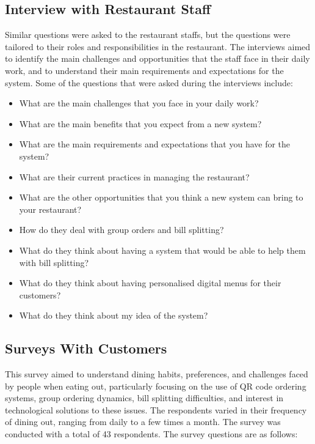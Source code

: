 \subsection*{Interview with Restaurant Staff}
Similar questions were asked to the restaurant staffs, but the questions were tailored to their roles and responsibilities in the restaurant. The interviews aimed to identify the main challenges and opportunities that the staff face in their daily work, and to understand their main requirements and expectations for the system. Some of the questions that were asked during the interviews include:
\begin{itemize}
    \item What are the main challenges that you face in your daily work?
    \item What are the main benefits that you expect from a new system?
    \item What are the main requirements and expectations that you have for the system?
    \item What are their current practices in managing the restaurant?
    \item What are the other opportunities that you think a new system can bring to your restaurant?
    \item How do they deal with group orders and bill splitting?
    \item What do they think about having a system that would be able to help them with bill splitting?
    \item What do they think about having personalised digital menus for their customers?
    \item What do they think about my idea of the system?
\end{itemize}

\subsection*{Surveys With Customers}
This survey aimed to understand dining habits, preferences, and challenges faced by people when eating out, particularly focusing on the use of QR code ordering systems, group ordering dynamics, bill splitting difficulties, and interest in technological solutions to these issues. The respondents varied in their frequency of dining out, ranging from daily to a few times a month. The survey was conducted with a total of 43 respondents. The survey questions are as follows:

